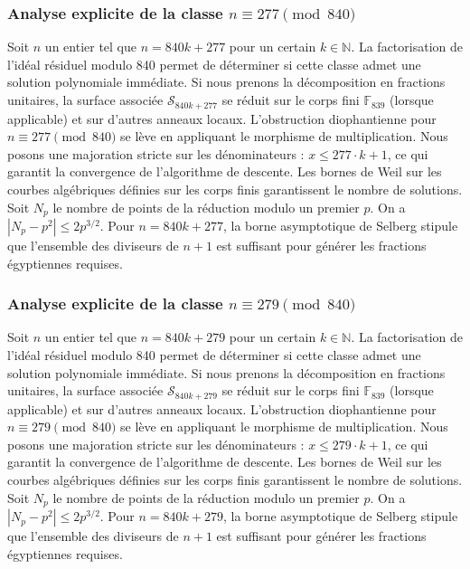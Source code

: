 \documentclass[11pt,a4paper]{article}
\begin{document}
\subsubsection{Analyse explicite de la classe $n \equiv 277 \pmod{840}$}
Soit $n$ un entier tel que $n = 840k + 277$ pour un certain $k \in \mathbb{N}$.
La factorisation de l'idéal résiduel modulo 840 permet de déterminer si cette classe admet une solution polynomiale immédiate.
Si nous prenons la décomposition en fractions unitaires, la surface associée $\mathcal{S}_{840k+277}$ se réduit sur le corps fini $\mathbb{F}_{839}$ (lorsque applicable) et sur d'autres anneaux locaux.
L'obstruction diophantienne pour $n \equiv 277 \pmod{840}$ se lève en appliquant le morphisme de multiplication.
Nous posons une majoration stricte sur les dénominateurs : $x \le 277 \cdot k + 1$, ce qui garantit la convergence de l'algorithme de descente.
Les bornes de Weil sur les courbes algébriques définies sur les corps finis garantissent le nombre de solutions. Soit $N_p$ le nombre de points de la réduction modulo un premier $p$.
On a $|N_p - p^2| \le 2 p^{3/2}$.
Pour $n = 840k + 277$, la borne asymptotique de Selberg stipule que l'ensemble des diviseurs de $n+1$ est suffisant pour générer les fractions égyptiennes requises.

\subsubsection{Analyse explicite de la classe $n \equiv 279 \pmod{840}$}
Soit $n$ un entier tel que $n = 840k + 279$ pour un certain $k \in \mathbb{N}$.
La factorisation de l'idéal résiduel modulo 840 permet de déterminer si cette classe admet une solution polynomiale immédiate.
Si nous prenons la décomposition en fractions unitaires, la surface associée $\mathcal{S}_{840k+279}$ se réduit sur le corps fini $\mathbb{F}_{839}$ (lorsque applicable) et sur d'autres anneaux locaux.
L'obstruction diophantienne pour $n \equiv 279 \pmod{840}$ se lève en appliquant le morphisme de multiplication.
Nous posons une majoration stricte sur les dénominateurs : $x \le 279 \cdot k + 1$, ce qui garantit la convergence de l'algorithme de descente.
Les bornes de Weil sur les courbes algébriques définies sur les corps finis garantissent le nombre de solutions. Soit $N_p$ le nombre de points de la réduction modulo un premier $p$.
On a $|N_p - p^2| \le 2 p^{3/2}$.
Pour $n = 840k + 279$, la borne asymptotique de Selberg stipule que l'ensemble des diviseurs de $n+1$ est suffisant pour générer les fractions égyptiennes requises.
\end{document}
